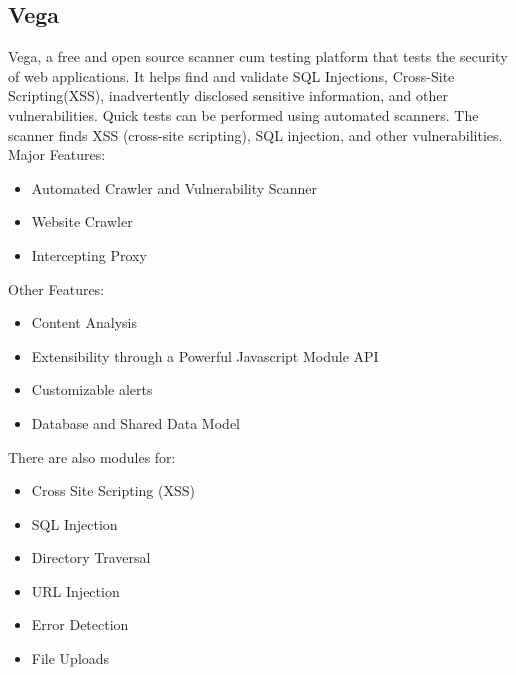\subsection{Vega}
Vega, a free and open source scanner cum testing platform that tests the security of web applications. It helps find and validate SQL Injections, Cross-Site Scripting(XSS), inadvertently disclosed sensitive information, and other vulnerabilities.
Quick tests can be performed using automated scanners. The scanner finds XSS (cross-site scripting), SQL injection, and other vulnerabilities. \\

Major Features:
\begin{itemize}
    \item Automated Crawler and Vulnerability Scanner
    \item Website Crawler
    \item Intercepting Proxy
\end{itemize}

Other Features:
\begin{itemize}
    \item Content Analysis
    \item Extensibility through a Powerful Javascript Module API
    \item Customizable alerts
    \item Database and Shared Data Model
\end{itemize}

There are also modules for:
\begin{itemize}
    \item Cross Site Scripting (XSS)
    \item SQL Injection
    \item Directory Traversal
    \item URL Injection
    \item Error Detection
    \item File Uploads
\end{itemize}
